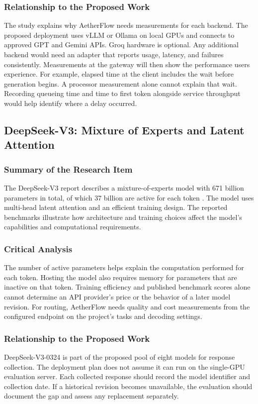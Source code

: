 \documentclass{FastFyp}
\begin{document}
\subsubsection{Relationship to the Proposed Work}
The study explains why AetherFlow needs measurements for each backend. The proposed deployment uses vLLM or Ollama on local GPUs and connects to approved GPT and Gemini APIs. Groq hardware is optional. Any additional backend would need an adapter that reports usage, latency, and failures consistently. Measurements at the gateway will then show the performance users experience. For example, elapsed time at the client includes the wait before generation begins. A processor measurement alone cannot explain that wait. Recording queueing time and time to first token alongside service throughput would help identify where a delay occurred.

\subsection{DeepSeek-V3: Mixture of Experts and Latent Attention}
\subsubsection{Summary of the Research Item}
The DeepSeek-V3 report describes a mixture-of-experts model with 671 billion parameters in total, of which 37 billion are active for each token \cite{ref:DeepSeekV3}. The model uses multi-head latent attention and an efficient training design. The reported benchmarks illustrate how architecture and training choices affect the model's capabilities and computational requirements.

\subsubsection{Critical Analysis}
The number of active parameters helps explain the computation performed for each token. Hosting the model also requires memory for parameters that are inactive on that token. Training efficiency and published benchmark scores alone cannot determine an API provider's price or the behavior of a later model revision. For routing, AetherFlow needs quality and cost measurements from the configured endpoint on the project's tasks and decoding settings.

\subsubsection{Relationship to the Proposed Work}
DeepSeek-V3-0324 is part of the proposed pool of eight models for response collection. The deployment plan does not assume it can run on the single-GPU evaluation server. Each collected response should record the model identifier and collection date. If a historical revision becomes unavailable, the evaluation should document the gap and assess any replacement separately.
\end{document}
